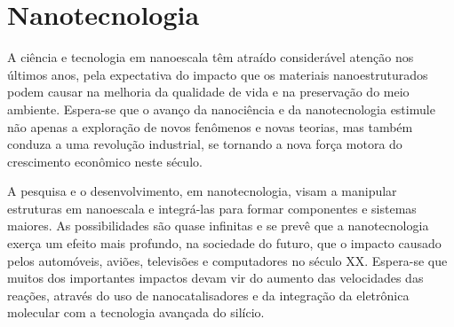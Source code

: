 \documentclass[10pt]{scrartcl}
\author{fabio}
\date{\today}
\title{}
\def\disciplina{Química}
\begin{document}
\twocolumn[

%




%

\smallbreak
\medbreak
\par\vspace{2ex}]%


\section{Nanotecnologia}
\label{sec:org02a6abd}
A ciência e tecnologia em nanoescala têm atraído considerável atenção nos últimos anos, pela expectativa do impacto que os materiais nanoestruturados podem causar na melhoria da qualidade de vida e na preservação do meio ambiente. Espera-se que o avanço da nanociência e da nanotecnologia estimule não apenas a exploração de novos fenômenos e novas teorias, mas também conduza a uma revolução industrial, se tornando a nova força motora do crescimento econômico neste século.

A pesquisa e o desenvolvimento, em nanotecnologia, visam a manipular estruturas em nanoescala e integrá-las para formar componentes e sistemas maiores. As possibilidades são quase infinitas e se prevê que a nanotecnologia exerça um efeito mais profundo, na sociedade do futuro, que o impacto causado pelos automóveis, aviões, televisões e computadores no século XX. Espera-se que muitos dos importantes impactos devam vir do aumento das velocidades das reações, através do uso de nanocatalisadores e da integração da eletrônica molecular com a tecnologia avançada do silício.
\end{document}

